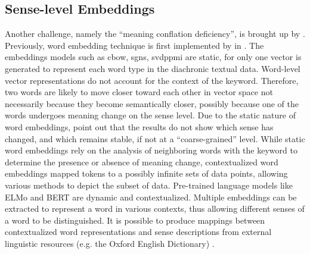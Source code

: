 \subsection{Sense-level Embeddings}
Another challenge, namely the ``meaning conflation deficiency'', is brought up by \textcite{camacho2018survey}. Previously, word embedding technique is first implemented by \citeauthor{mikolov2013efficient} in \citeyear{mikolov2013efficient}. The embeddings models such as \gls{cbow}, \gls{sgns}, \gls{svdppmi} are static, for only one vector is generated to represent each word type in the diachronic textual data. Word-level vector representations do not account for the context of the keyword. Therefore, two words are likely to move closer toward each other in vector space not necessarily because they become semantically closer, possibly because one of the words undergoes meaning change on the sense level. Due to the static nature of word embeddings, \textcite{hu2019diachronic} point out that the results do not show which sense has changed, and which remains stable, if not at a ``coarse-grained'' level. While static word embeddings rely on the analysis of neighboring words with the keyword to determine the presence or absence of meaning change, contextualized word embeddings mapped tokens to a possibly infinite sets of data points, allowing various methods to depict the subset of data. Pre-trained language models like ELMo and BERT are dynamic and contextualized. Multiple embeddings can be extracted to represent a word in various contexts, thus allowing different senses of a word to be distinguished. It is possible to produce mappings between contextualized word representations and sense descriptions from external linguistic resources (e.g. the Oxford English Dictionary) \parencite{hu2019diachronic}.

